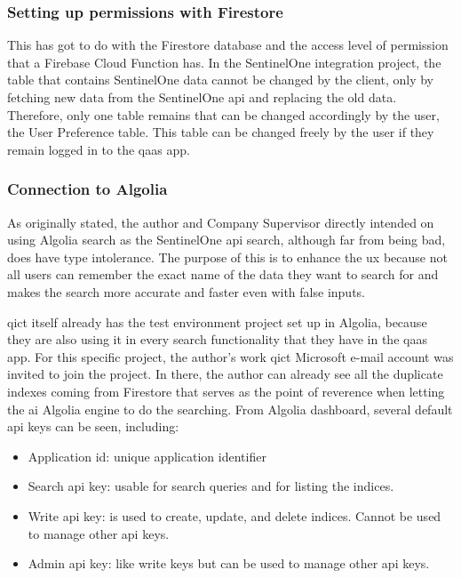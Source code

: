 \subsubsection{Setting up permissions with Firestore}

This has got to do with the Firestore database and the access level of permission that a Firebase Cloud Function has. In the
SentinelOne integration project, the table that contains SentinelOne data cannot be changed by the client, only by fetching new
data from the SentinelOne \acrshort{api} and replacing the old data. Therefore, only one table remains that can be
changed accordingly by the user, the User Preference table. This table can be changed freely by the user if they remain
logged in to the \acrshort{qaas} app.


\subsubsection{Connection to Algolia}

As originally stated, the author and Company Supervisor directly intended on using Algolia search as the SentinelOne
\acrshort{api} search, although far from being bad, does have type intolerance. The purpose of this is to enhance the \acrshort{ux}
because not all users can remember the exact name of the data they want to search for and makes the search more accurate and faster
even with false inputs.

\acrshort{qict} itself already has the test environment project set up in Algolia, because they are also using it in every search functionality
that they have in the \acrshort{qaas} app. For this specific project, the author's work \acrshort{qict} Microsoft e-mail account was invited to join
the project. In there, the author can already see all the duplicate indexes coming from Firestore that serves as the point of reverence when letting
the \acrshort{ai} Algolia engine to do the searching. From Algolia dashboard, several default \acrshort{api} keys can be seen, including:
\begin{itemize}
      \item Application \acrshort{id}: unique application identifier
      \item Search \acrshort{api} key: usable for search queries and for listing the indices.
      \item Write \acrshort{api} key: is used to create, update, and delete indices. Cannot be used to manage other \acrshort{api} keys.
      \item Admin \acrshort{api} key: like write keys but can be used to manage other \acrshort{api} keys.
\end{itemize}

